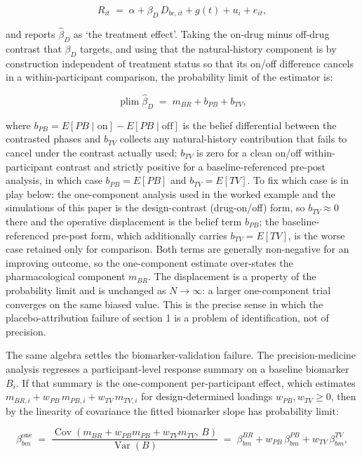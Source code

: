 \documentclass[
  11pt,
]{article}
\begin{document}
\[ R_{it} \;=\; \alpha + \beta_D\,D_{bc,it} + g(t) + u_i + e_{it}, \]

and reports \(\hat\beta_D\) as `the treatment effect'. Taking the on-drug minus
off-drug contrast that \(\beta_D\) targets, and using that the natural-history
component is by construction independent of treatment status so that its
on/off difference cancels in a within-participant comparison, the probability
limit of the estimator is:

\[ \operatorname{plim}\hat\beta_D \;=\; m_{BR} + b_{PB} + b_{TV}, \]

where \(b_{PB} = E[PB \mid \text{on}] - E[PB \mid \text{off}]\) is the belief
differential between the contrasted phases and \(b_{TV}\) collects any
natural-history contribution that fails to cancel under the contrast actually
used; \(b_{TV}\) is zero for a clean on/off within-participant contrast and
strictly positive for a baseline-referenced pre-post analysis, in which case
\(b_{PB} = E[PB]\) and \(b_{TV} = E[TV]\). To fix which case is in play below: the
one-component analysis used in the worked example and the simulations of this
paper is the design-contrast (drug-on/off) form, so \(b_{TV} \approx 0\) there
and the operative displacement is the belief term \(b_{PB}\); the
baseline-referenced pre-post form, which additionally carries \(b_{TV} = E[TV]\),
is the worse case retained only for comparison. Both terms are generally
non-negative for an improving outcome, so the one-component estimate
over-states the pharmacological component \(m_{BR}\). The displacement is a
property of the probability limit and is unchanged as \(N \to \infty\): a larger
one-component trial converges on the same biased value. This is the precise
sense in which the placebo-attribution failure of section 1 is a problem of
identification, not of precision.

The same algebra settles the biomarker-validation failure. The
precision-medicine analysis regresses a participant-level response summary on
a baseline biomarker \(B_i\). If that summary is the one-component
per-participant effect, which estimates \(m_{BR,i} + w_{PB}\,m_{PB,i} +
w_{TV}\,m_{TV,i}\) for design-determined loadings \(w_{PB}, w_{TV} \ge 0\), then
by the linearity of covariance the fitted biomarker slope has probability
limit:

\[ \beta_{bm}^{\text{one}} \;=\; \frac{\operatorname{Cov}(m_{BR} + w_{PB}
m_{PB} + w_{TV} m_{TV},\, B)}{\operatorname{Var}(B)} \;=\; \beta_{bm}^{BR} +
w_{PB}\,\beta_{bm}^{PB} + w_{TV}\,\beta_{bm}^{TV}, \]
\end{document}
